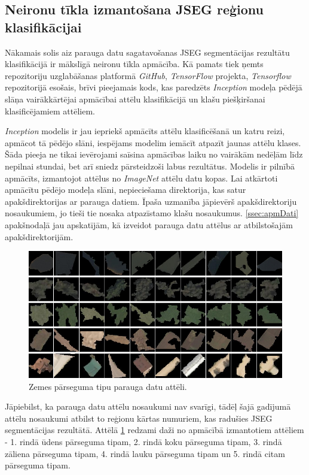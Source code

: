 \documentclass[12pt,paper=a4]{report}
\begin{document}
\subsection{Neironu tīkla izmantošana JSEG reģionu klasifikācijai}
Nākamais solis aiz parauga datu sagatavošanas JSEG segmentācijas rezultātu klasifikācijā ir mākslīgā neironu tīkla apmācība. Kā pamats tiek ņemts repozitoriju uzglabāšanas platformā \textit{GitHub}, \textit{TensorFlow} projekta, \textit{Tensorflow} repozitorijā esošais, brīvi pieejamais kods, kas paredzēts \textit{Inception} modeļa pēdējā slāņa vairākkārtējai apmācībai attēlu klasifikācijā un klašu piešķiršanai klasificējamiem attēliem.\par
\textit{Inception} modelis ir jau iepriekš apmācīts attēlu klasificēšanā un katru reizi, apmācot tā pēdējo slāni, iespējams modelim iemācīt atpazīt jaunas attēlu klases. Šāda pieeja ne tikai ievērojami saīsina apmācības laiku no vairākām nedēļām līdz nepilnai stundai, bet arī sniedz pārsteidzoši labus rezultātus. Modelis ir pilnībā apmācīts, izmantojot attēlus no \textit{ImageNet} attēlu datu kopas. Lai atkārtoti apmācītu pēdējo modeļa slāni, nepieciešama direktorija, kas satur apakšdirektorijas ar parauga datiem. Īpaša uzmanība jāpievērš apakšdirektoriju nosaukumiem, jo tieši tie nosaka atpazīstamo klašu nosaukumus. \ref{ssec:apmDati} apakšnodaļā jau apskatījām, kā izveidot parauga datu attēlus ar atbilstošajām apakšdirektorijām.
\begin{figure}[h!]
\centering
\includegraphics[width=\linewidth]{paraugaDatiTF}
\caption{Zemes pārseguma tipu parauga datu attēli.}
\label{fig:paraugaDati}
\end{figure}
Jāpiebilst, ka parauga datu attēlu nosaukumi nav svarīgi, tādēļ šajā gadījumā attēlu nosaukumi atbilst to reģionu kārtas numuriem, kas radušies JSEG segmentācijas rezultātā. Attēlā \ref{fig:paraugaDati} redzami daži no apmācībā izmantotiem attēliem - 1. rindā ūdens pārseguma tipam, 2. rindā koku pārseguma tipam, 3. rindā zāliena pārseguma tipam, 4. rindā lauku pārseguma tipam un 5. rindā citam pārseguma tipam.\par
\end{document}
